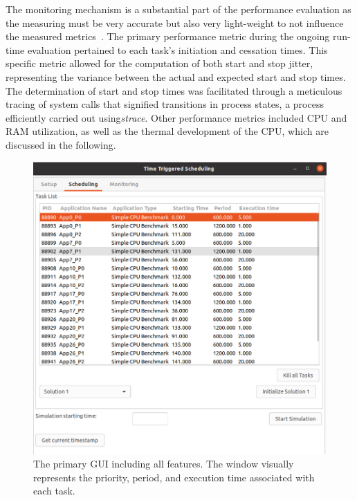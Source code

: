 \begin{itemize}
    The monitoring mechanism is a substantial part of the performance evaluation as the measuring must be very accurate but also very light-weight to not influence the measured metrics~\cite{askaripoor2021flexible,9613692, askaripoor2023designer}. %
    The primary performance metric during the ongoing run-time evaluation pertained to each task's initiation and cessation times. This specific metric allowed for the computation of both start and stop jitter, representing the variance between the actual and expected start and stop times. The determination of start and stop times was facilitated through a meticulous tracing of system calls that signified transitions in process states, a process efficiently carried out using\textit{strace}. Other performance metrics included CPU and RAM utilization, as well as the thermal development of the CPU, which are discussed in the following. 
    

    \begin{figure}[t]
    \centering
    \includegraphics[width=0.8\columnwidth]{figures/TTScheduling.png}
    \caption{The primary GUI including all features. The window visually represents the priority, period, and execution time associated with each task.}
    \label{fig0079}
    \end{figure}
    

\end{itemize}
